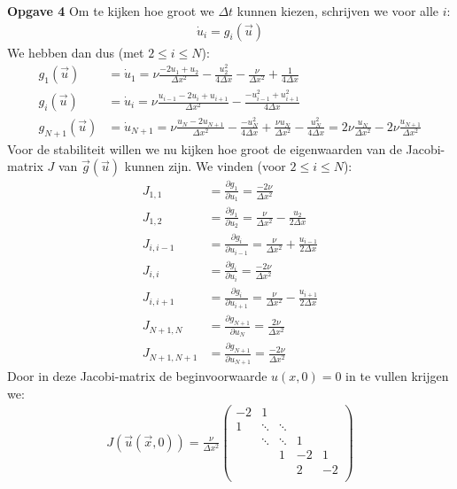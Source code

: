 \documentclass{article}
\newcommand{\Dt}{\Delta t}
\begin{document}
\textbf{Opgave 4}
Om te kijken hoe groot we $\Dt$ kunnen kiezen, schrijven we voor alle $i$:
\begin{align*}
\dot{u}_i =g_i(\vec{u})
\end{align*}
We hebben dan dus (met $2\leq i \leq N$):
\begin{align*}
g_1(\vec{u})&=\dot{u}_1 = \nu \frac{-2u_1+u_2}{\Delta x^2} -\frac{u_2^2}{4\Delta x} -\frac{\nu}{\Delta x^2} +\frac{1}{4\Delta x}\\
g_i(\vec{u})&=\dot{u}_i = \nu \frac{u_{i-1}-2u_i+u_{i+1}}{\Delta x^2} -\frac{-u_{i-1}^2+u_{i+1}^2}{4\Delta x}\\
g_{N+1}(\vec{u})&=\dot{u}_{N+1} = \nu \frac{u_{N}-2u_{N+1}}{\Delta x^2} -\frac{-u_N^2}{4\Delta x} +\frac{\nu u_N}{\Delta x^2} -\frac{u_N^2}{4\Delta x}
=2\nu \frac{u_N}{\Delta x^2} -2\nu\frac{u_{N+1}}{\Delta x^2}
\end{align*}
Voor de stabiliteit willen we nu kijken hoe groot de eigenwaarden van de Jacobi-matrix $J$ van $\vec{g}(\vec{u})$ kunnen zijn.
We vinden (voor $2\leq i\leq N$):
\begin{align*}
J_{1,1} &= \frac{\partial g_1}{\partial u_1} = \frac{-2\nu}{\Delta x^2}\\
J_{1,2} &= \frac{\partial g_1}{\partial u_2} = \frac{\nu}{\Delta x^2} -\frac{u_2}{2\Delta x}\\
J_{i,i-1} &= \frac{\partial g_i}{\partial u_{i-1}} = \frac{\nu}{\Delta x^2}+\frac{u_{i-1}}{2\Delta x}\\
J_{i,i} &= \frac{\partial g_i}{\partial u_i} = \frac{-2\nu}{\Delta x^2}\\
J_{i,i+1} &= \frac{\partial g_i}{\partial u_{i+1}} = \frac{\nu}{\Delta x^2} -\frac{u_{i+1}}{2\Delta x}\\
J_{N+1,N} &= \frac{\partial g_{N+1}}{\partial u_N} =  \frac{2\nu}{\Delta x^2}\\
J_{N+1,N+1} &= \frac{\partial g_{N+1}}{\partial u_{N+1}} = \frac{-2\nu}{\Delta x^2}
\end{align*}
Door in deze Jacobi-matrix de beginvoorwaarde $u(x,0) =0$ in te vullen krijgen we:
\begin{align*}
J(\vec{u}(\vec{x},0)) = \frac{\nu}{\Delta x^2}
\begin{pmatrix}
-2 & 1 & &&\\
1 &\ddots &\ddots&&\\
&\ddots &\ddots&1&\\
& &1&-2&1\\
& &&2&-2\\
\end{pmatrix}
\end{align*}
\end{document}
